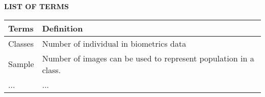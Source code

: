\begin{center}  
\normalfont\LARGE\textbf{LIST OF TERMS}
\end{center}
\begin{longtable}{p{2.5cm} p{11.5cm}}
	\textbf{Terms} & \textbf{Definition}\\
	\hline \endhead
	Classes & Number of individual in biometrics data\\
	Sample & Number of images can be used to represent population in a class.\\
	... & ...\\
\end{longtable}


